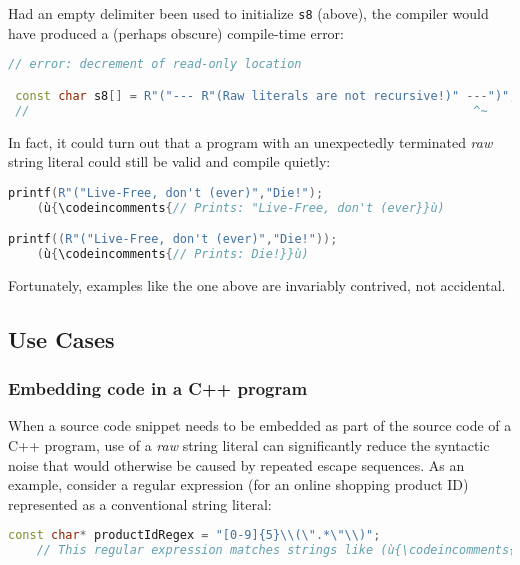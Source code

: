 \noindent Had an empty delimiter been used to initialize \texttt{s8} (above), the
compiler would have produced a (perhaps obscure) compile-time error:

\begin{lstlisting}[language=C++]
 // error: decrement of read-only location

 const char s8[] = R"("--- R"(Raw literals are not recursive!)" ---")";
 //                                                              ^~
\end{lstlisting}

\noindent In fact, it could turn out that a program with an unexpectedly
terminated \emph{raw} string literal could still be valid and compile
quietly:

\begin{lstlisting}[language=C++]
printf(R"("Live-Free, don't (ever)","Die!");
    (ù{\codeincomments{// Prints: "Live-Free, don't (ever}}ù)

printf((R"("Live-Free, don't (ever)","Die!"));
    (ù{\codeincomments{// Prints: Die!}}ù)
\end{lstlisting}

\noindent Fortunately, examples like the one above are invariably contrived, not
accidental.

\subsection[Use Cases]{Use Cases}\label{use-cases}

\subsubsection[Embedding code in a C++ program]{Embedding code in a C++ program}\label{embedding-code-in-a-c++-program}

When a source code snippet needs to be embedded as part of the source
code of a C++ program, use of a \emph{raw} string literal can
significantly reduce the syntactic noise that would otherwise be caused
by repeated escape sequences. As an example, consider a regular
expression (for an online shopping product ID) represented as a
conventional string literal:

\begin{lstlisting}[language=C++]
const char* productIdRegex = "[0-9]{5}\\(\".*\"\\)";
    // This regular expression matches strings like (ù{\codeincomments{12345("Product")}}ù).
\end{lstlisting}

